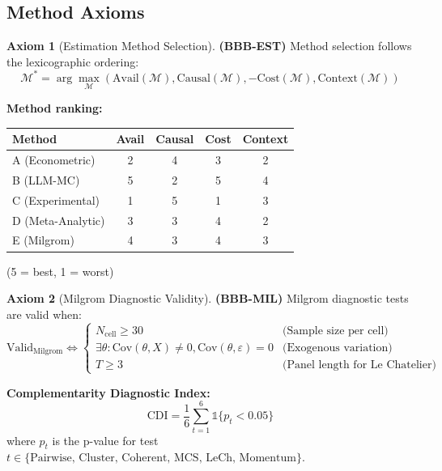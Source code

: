 \documentclass[11pt,a4paper]{article}
\theoremstyle{definition}
\newtheorem{axiom}{Axiom}[section]
\begin{document}
\subsection{Method Axioms}

\begin{axiom}[Estimation Method Selection]
\label{ax:bbb-est-full}
\textbf{(BBB-EST)} Method selection follows the lexicographic ordering:
\begin{equation}
\mathcal{M}^* = \arg\max_{\mathcal{M}} \left( \text{Avail}(\mathcal{M}), \text{Causal}(\mathcal{M}), -\text{Cost}(\mathcal{M}), \text{Context}(\mathcal{M}) \right)
\end{equation}

\textbf{Method ranking:}
\begin{center}
\begin{tabular}{lcccc}
\toprule
Method & Avail & Causal & Cost & Context \\
\midrule
A (Econometric) & 2 & 4 & 3 & 2 \\
B (LLM-MC) & 5 & 2 & 5 & 4 \\
C (Experimental) & 1 & 5 & 1 & 3 \\
D (Meta-Analytic) & 3 & 3 & 4 & 2 \\
E (Milgrom) & 4 & 3 & 4 & 3 \\
\bottomrule
\end{tabular}
\end{center}
(5 = best, 1 = worst)
\end{axiom}

\begin{axiom}[Milgrom Diagnostic Validity]
\label{ax:bbb-mil-full}
\textbf{(BBB-MIL)} Milgrom diagnostic tests are valid when:
\begin{equation}
\text{Valid}_{\text{Milgrom}} \Leftrightarrow 
\begin{cases}
N_{\text{cell}} \geq 30 & \text{(Sample size per cell)} \\
\exists \theta: \text{Cov}(\theta, X) \neq 0, \text{Cov}(\theta, \varepsilon) = 0 & \text{(Exogenous variation)} \\
T \geq 3 & \text{(Panel length for Le Chatelier)}
\end{cases}
\end{equation}

\textbf{Complementarity Diagnostic Index:}
\begin{equation}
\text{CDI} = \frac{1}{6} \sum_{t=1}^{6} \mathbb{1}\{p_t < 0.05\}
\end{equation}
where $p_t$ is the p-value for test $t \in \{\text{Pairwise, Cluster, Coherent, MCS, LeCh, Momentum}\}$.
\end{axiom}
\end{document}
